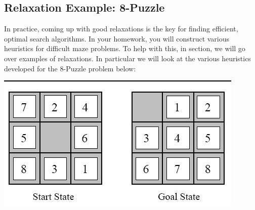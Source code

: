 \documentclass[11pt]{article}
\begin{document}
\subsection{Relaxation Example: 8-Puzzle}

In practice, coming up with good relaxations is the key for finding efficient, optimal search algorithms. In your homework, you will construct various heuristics for difficult maze problems. To help with this, in section, we will go over examples of relaxations. In particular we will look at the various heuristics developed for the 8-Puzzle problem below: 

\begin{center}
  \includegraphics{puzzle}
\end{center}


\end{document}
